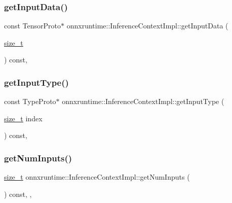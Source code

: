 \subsubsection{\texorpdfstring{get\+Input\+Data()}{getInputData()}}
{\footnotesize\ttfamily const Tensor\+Proto$\ast$ onnxruntime\+::\+Inference\+Context\+Impl\+::get\+Input\+Data (\begin{DoxyParamCaption}\item[{\mbox{\hyperlink{mlasi_8h_a503efbc1c6e50825320ad909366b78ab}{size\+\_\+t}}}]{ }\end{DoxyParamCaption}) const\hspace{0.3cm}{\ttfamily [inline]}, {\ttfamily [override]}}

\mbox{\label{classonnxruntime_1_1InferenceContextImpl_af2af6aa91a8dbdb477866da91856cbca}} 
\subsubsection{\texorpdfstring{get\+Input\+Type()}{getInputType()}}
{\footnotesize\ttfamily const Type\+Proto$\ast$ onnxruntime\+::\+Inference\+Context\+Impl\+::get\+Input\+Type (\begin{DoxyParamCaption}\item[{\mbox{\hyperlink{mlasi_8h_a503efbc1c6e50825320ad909366b78ab}{size\+\_\+t}}}]{index }\end{DoxyParamCaption}) const\hspace{0.3cm}{\ttfamily [inline]}, {\ttfamily [override]}}

\mbox{\label{classonnxruntime_1_1InferenceContextImpl_a746e9bef7556f5396035691aee180fe1}} 
\subsubsection{\texorpdfstring{get\+Num\+Inputs()}{getNumInputs()}}
{\footnotesize\ttfamily \mbox{\hyperlink{mlasi_8h_a503efbc1c6e50825320ad909366b78ab}{size\+\_\+t}} onnxruntime\+::\+Inference\+Context\+Impl\+::get\+Num\+Inputs (\begin{DoxyParamCaption}{ }\end{DoxyParamCaption}) const\hspace{0.3cm}{\ttfamily [inline]}, {\ttfamily [override]}, {\ttfamily [noexcept]}}

